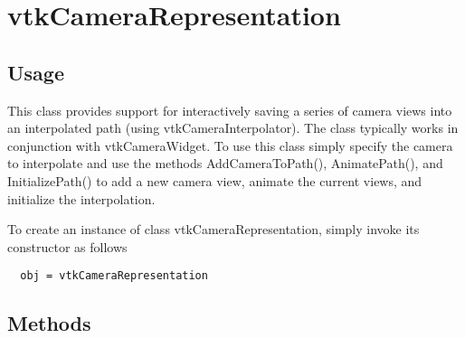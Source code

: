 \section{vtkCameraRepresentation}

\subsection{Usage}

 This class provides support for interactively saving a series of camera
 views into an interpolated path (using vtkCameraInterpolator). The class
 typically works in conjunction with vtkCameraWidget. To use this class
 simply specify the camera to interpolate and use the methods
 AddCameraToPath(), AnimatePath(), and InitializePath() to add a new camera
 view, animate the current views, and initialize the interpolation.

To create an instance of class vtkCameraRepresentation, simply
invoke its constructor as follows
\begin{verbatim}
  obj = vtkCameraRepresentation
\end{verbatim}
\subsection{Methods}

